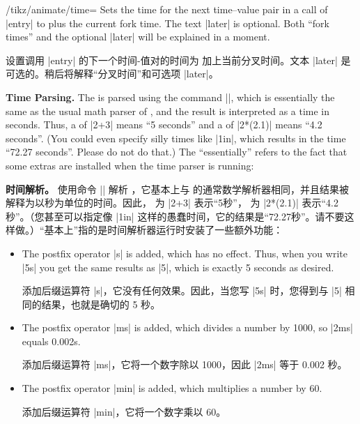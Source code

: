 \begin{key}{/tikz/animate/time=}
    Sets the time for the next time--value pair in a call of |entry| to
     plus the current fork time. The text |later| is optional. Both
    ``fork times'' and the optional |later| will be explained in a moment.

    设置调用 |entry| 的下一个时间-值对的时间为  加上当前分叉时间。文本 |later| 是可选的。稍后将解释“分叉时间”和可选项 |later|。


    \medskip\textbf{Time Parsing.}
    The  is parsed using the command |\pgfparsetime|, which is
    essentially the same as the usual math parser of \tikzname, and the result
    is interpreted as a time in seconds. Thus, a  of |2+3| means ``5
    seconds'' and a  of |2*(2.1)| means ``4.2 seconds''. (You could
    even specify silly times like |1in|, which results in the time ``72.27
    seconds''. Please do not do that.) The ``essentially''  refers to the fact
    that some extras are installed when the time parser is running:

    \medskip\textbf{时间解析。}
使用命令 |\pgfparsetime| 解析 ，它基本上与 \tikzname 的通常数学解析器相同，并且结果被解释为以秒为单位的时间。因此， 为 |2+3| 表示“5秒”， 为 |2*(2.1)| 表示“4.2秒”。（您甚至可以指定像 |1in| 这样的愚蠢时间，它的结果是“72.27秒”。请不要这样做。）“基本上”指的是时间解析器运行时安装了一些额外功能：


    \begin{itemize}
        \item The postfix operator |s| is added, which has no effect. Thus,
            when you write |5s| you get the same results as |5|, which is
            exactly 5 seconds as desired.

            添加后缀运算符 |s|，它没有任何效果。因此，当您写 |5s| 时，您得到与 |5| 相同的结果，也就是确切的 5 秒。


        \item The postfix operator |ms| is added, which divides a number by
            1000, so |2ms| equals 0.002s.

            添加后缀运算符 |ms|，它将一个数字除以 1000，因此 |2ms| 等于 0.002 秒。


        \item The postfix operator |min| is added, which multiplies a number by
            60.

            添加后缀运算符 |min|，它将一个数字乘以 60。



\end{itemize}
\end{key}
